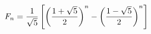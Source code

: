\documentclass[preview]{standalone}
\begin{document}
\begin{align*}
\special{dvisvgm:raw <g id='unique000'>}F_n = \frac{1}{\sqrt{5}}\left[\left(\frac{1+\sqrt{5}}{2}\right)^n- \left(\frac{1-\sqrt{5}}{2}\right)^n\right]\special{dvisvgm:raw </g>}
\end{align*}
\end{document}
